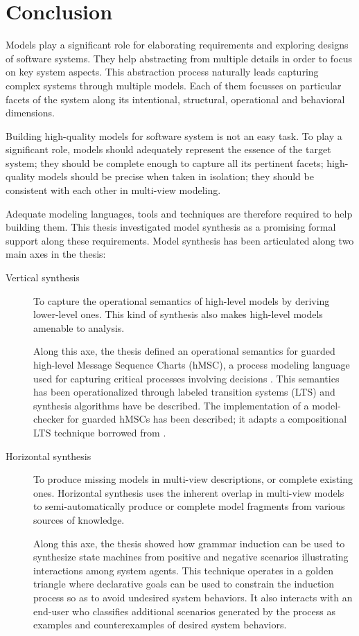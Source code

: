 \chapter{Conclusion\label{chapter:conclusion}}

Models play a significant role for elaborating requirements and exploring designs of software systems. They help abstracting from multiple details in order to focus on key system aspects. This abstraction process naturally leads capturing complex systems through multiple models. Each of them focusses on particular facets of the system along its intentional, structural, operational and behavioral dimensions.

Building high-quality models for software system is not an easy task. To play a significant role, models should adequately represent the essence of the target system; they should be complete enough to capture all its pertinent facets; high-quality models should be precise when taken in isolation; they should be consistent with each other in multi-view modeling. 

Adequate modeling languages, tools and techniques are therefore required to help building them. This thesis investigated model synthesis as a promising formal support along these requirements. Model synthesis has been articulated along two main axes in the thesis:
\begin{description}
\item[Vertical synthesis] To capture the operational semantics of high-level models by deriving lower-level ones. This kind of synthesis also makes high-level models amenable to analysis.

Along this axe, the thesis defined an operational semantics for guarded high-level Message Sequence Charts (hMSC), a process modeling language used for capturing critical processes involving decisions \cite{Damas:2011}. This semantics has been operationalized through labeled transition systems (LTS) and synthesis algorithms have be described. The implementation of a model-checker for guarded hMSCs has been described; it adapts a compositional LTS technique borrowed from \cite{Giannakopoulou:2003}.

\item[Horizontal synthesis] To produce missing models in multi-view descriptions, or complete existing ones. Horizontal synthesis uses the inherent overlap in multi-view models to semi-automatically produce or complete model fragments from various sources of knowledge.

Along this axe, the thesis showed how grammar induction can be used to synthesize state machines from positive and negative scenarios illustrating interactions among system agents. This technique operates in a golden triangle where declarative goals can be used to constrain the induction process so as to avoid undesired system behaviors. It also interacts with an end-user who classifies additional scenarios generated by the process as examples and counterexamples of desired system behaviors.
\end{description}

